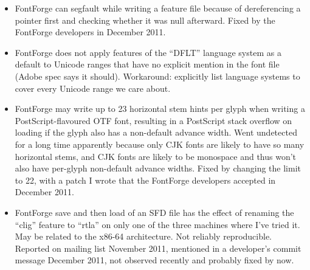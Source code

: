 \documentclass[14pt]{extarticle}
\begin{document}
\begin{itemize}
  \item FontForge can segfault while writing a feature file because of
    dereferencing a pointer first and checking whether it was null
    afterward.  Fixed by the FontForge developers in December 2011.

  \item FontForge does not apply features of the ``DFLT'' language system as
    a default to Unicode ranges that have no explicit mention in the font
    file (Adobe spec says it should).  Workaround: explicitly list language
    systems to cover every Unicode range we care about.

  \item FontForge may write up to 23 horizontal stem hints per glyph when
    writing a PostScript-flavoured OTF font, resulting in a PostScript stack
    overflow on loading if the glyph also has a non-default advance width. 
    Went undetected for a long time apparently because only CJK fonts are
    likely to have so many horizontal stems, and CJK fonts are likely to
    be monospace and thus won't also have per-glyph non-default advance
    widths.  Fixed by changing the limit to 22, with a patch I wrote that
    the FontForge developers accepted in December 2011.

  \item FontForge save and then load of an SFD file has the effect of
    renaming the ``clig'' feature to ``rtla'' on only one of the three
    machines where I've tried it.  May be related to the x86-64
    architecture.  Not reliably reproducible.  Reported on mailing list
    November 2011, mentioned in a developer's commit message December 2011,
    not observed recently and probably fixed by now.


\end{itemize}
\end{document}
